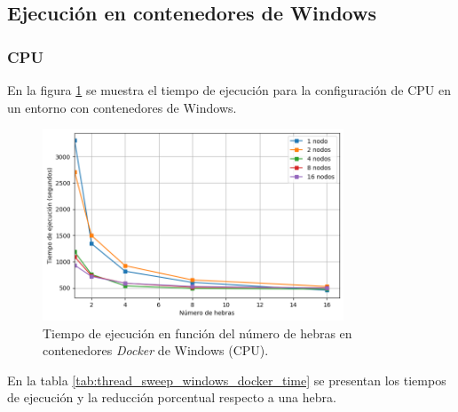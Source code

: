 \subsection{Ejecución en contenedores de Windows}
\subsubsection{CPU}

En la figura \ref{fig:thread_sweep_windows_docker_time} se muestra el tiempo de ejecución para la configuración de CPU en un entorno con contenedores de Windows.

\begin{figure}[H]
    \centering
    \includegraphics[width=0.8\textwidth]{imagenes/cap5/thread_sweep_windows_docker_time.png}
    \caption{Tiempo de ejecución en función del número de hebras en contenedores \textit{Docker} de Windows (CPU).}
    \label{fig:thread_sweep_windows_docker_time}
\end{figure}

En la tabla \ref{tab:thread_sweep_windows_docker_time} se presentan los tiempos de ejecución y la reducción porcentual respecto a una hebra.

